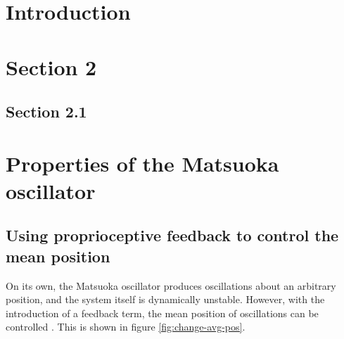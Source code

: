 \documentclass[12pt,twoside]{article}
\theoremstyle{plain}
\theoremstyle{definition}
\theoremstyle{remark}
\begin{document}
\section{Introduction}
\label{sec:introduction}


\section{Section 2}

\subsection{Section 2.1}

\section{Properties of the Matsuoka oscillator}

\subsection{Using proprioceptive feedback to control the mean position}
On its own, the Matsuoka oscillator produces oscillations about an arbitrary position, and the system itself is dynamically unstable. However, with the introduction of a feedback term, the mean position of oscillations can be controlled \cite{ronsse2009computational}. This is shown in figure \ref{fig:change-avg-pos}.
\end{document}
